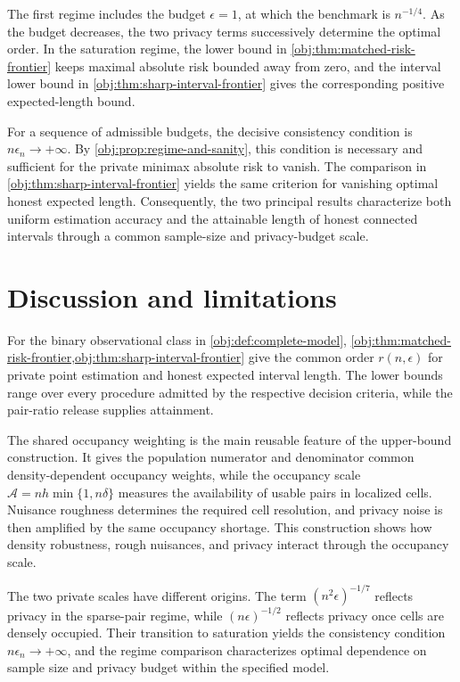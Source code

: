 \documentclass[11pt]{article}
\begin{document}
The first regime includes the budget \(\epsilon=1\), at which the benchmark is \(n^{-1/4}\). As the budget decreases, the two privacy terms successively determine the optimal order. In the saturation regime, the lower bound in \cref{obj:thm:matched-risk-frontier} keeps maximal absolute risk bounded away from zero, and the interval lower bound in \cref{obj:thm:sharp-interval-frontier} gives the corresponding positive expected-length bound.

For a sequence of admissible budgets, the decisive consistency condition is \(n\epsilon_n\to+\infty\). By \cref{obj:prop:regime-and-sanity}, this condition is necessary and sufficient for the private minimax absolute risk to vanish. The comparison in \cref{obj:thm:sharp-interval-frontier} yields the same criterion for vanishing optimal honest expected length. Consequently, the two principal results characterize both uniform estimation accuracy and the attainable length of honest connected intervals through a common sample-size and privacy-budget scale.


\section{Discussion and limitations}

For the binary observational class in \cref{obj:def:complete-model}, \cref{obj:thm:matched-risk-frontier,obj:thm:sharp-interval-frontier} give the common order \(r(n,\epsilon)\) for private point estimation and honest expected interval length. The lower bounds range over every procedure admitted by the respective decision criteria, while the pair-ratio release supplies attainment.

The shared occupancy weighting is the main reusable feature of the upper-bound construction. It gives the population numerator and denominator common density-dependent occupancy weights, while the occupancy scale \(\mathcal A=nh\min\{1,n\delta\}\) measures the availability of usable pairs in localized cells. Nuisance roughness determines the required cell resolution, and privacy noise is then amplified by the same occupancy shortage. This construction shows how density robustness, rough nuisances, and privacy interact through the occupancy scale.

The two private scales have different origins. The term \((n^2\epsilon)^{-1/7}\) reflects privacy in the sparse-pair regime, while \((n\epsilon)^{-1/2}\) reflects privacy once cells are densely occupied. Their transition to saturation yields the consistency condition \(n\epsilon_n\to+\infty\), and the regime comparison characterizes optimal dependence on sample size and privacy budget within the specified model.
\end{document}
